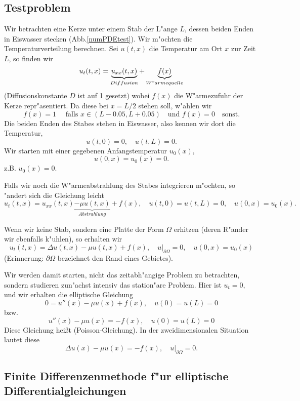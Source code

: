 
\subsection{Testproblem}
Wir betrachten eine Kerze unter einem Stab der L"ange $L$, 
dessen beiden Enden in 
Eiswasser stecken (Abb.\ref{numPDEtest}). Wir m"ochten die Temperaturverteilung berechnen.
Sei $u(t,x)$ die Temperatur am Ort $x$ zur Zeit $L$, so finden wir
$$ u_t(t,x) = \underbrace{u_{xx}(t,x)}_{Diffusion} + \underbrace{f(x)}_{W"armequelle}$$
(Diffusionskonstante $D$ ist auf 1 gesetzt)
wobei $f(x)$ die W"armezufuhr der Kerze repr"asentiert. Da diese bei $x=L/2$ stehen soll, w"ahlen wir
$$ f(x) = 1\quad\mbox{ falls } x\in (L-0.05, L+0.05)\quad\mbox{und } f(x)=0\quad\mbox{sonst}.$$
Die beiden Enden des Stabes stehen in Eiswasser, also
kennen wir dort die Temperatur,
$$ u(t,0)=0, \quad u(t,L)=0.$$
Wir starten mit einer gegebenen Anfangstemperatur $u_0(x)$,
$$ u(0,x) = u_0(x) = 0.$$
z.B. $u_0(x)=0$.\par\medskip

Falls wir noch die W"armeabstrahlung des Stabes integrieren m"ochten, so
"andert sich die Gleichung leicht
$$ u_t(t,x) = u_{xx}(t,x)\underbrace{-\mu u(t,x)}_{Abstrahlung} + f(x), \quad u(t,0)=u(t,L)=0,\quad u(0,x)=u_0(x).$$
\par\medskip

Wenn wir keine Stab, sondern eine Platte der Form $\Omega$ 
erhitzen (deren R"ander wir ebenfalls k"uhlen), so erhalten wir 
$$ u_t(t,x) = \Delta u(t,x)-\mu u(t,x) + f(x), \quad u|_{\partial\Omega} = 0,\quad u(0,x)=u_0(x)$$
(Erinnerung: $\partial\Omega$ bezeichnet den Rand eines Gebietes).
\par\medskip

Wir werden damit starten, nicht das zeitabh"angige Problem zu betrachten, sondern studieren zun"achst intensiv das station"are Problem. Hier ist 
$u_t=0$, und wir erhalten die elliptische Gleichung
$$ 0 = u''(x)-\mu u(x)+f(x), \quad u(0)=u(L)=0$$
bzw.
$$  u''(x) -\mu u(x) = -f(x), \quad u(0)=u(L)=0$$
Diese Gleichung hei\ss{}t (Poisson-Gleichung).
In der zweidimensionalen Situation lautet diese
$$  \Delta u(x) -\mu u(x) = -f(x), \quad u|_{\partial \Omega}=0.$$



\subsection{Finite Differenzenmethode f"ur elliptische Differentialgleichungen}

